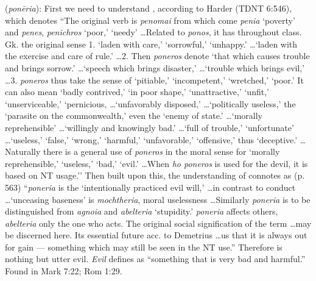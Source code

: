 \item[Evil,]

(\textit{ponēria}):
First we need to understand , according to Harder (TDNT 6:546), which denotes ``The original verb is \emph{penomai} from which come \emph{penia} `poverty' and \emph{penes}, \emph{penichros} `poor,' `needy' \ldots Related to \emph{ponos}, it has throughout class. Gk. the original sense 1. `laden with care,' `sorrowful,' `unhappy.' \ldots `laden with the exercise and care of rule.' \ldots 2. Then \emph{poneros} denote `that which causes trouble and brings sorrow.' \ldots  `speech which brings disaster,' \ldots  `trouble which brings evil,' \ldots 3. \emph{poneros} thus take the sense of `pitiable,' `incompetent,' `wretched,' `poor.' It can also mean `badly contrived,' `in poor shape,' `unattractive,' `unfit,' `unserviceable,' `pernicious, \ldots `unfavorably disposed,' \ldots `politically useless,' the `parasite on the commonwealth,' even the `enemy of state.' \ldots `morally reprehensible' \ldots `willingly and knowingly bad.' \ldots `full of trouble,' `unfortunate' \ldots `useless,' `false,' `wrong,' `harmful,' `unfavorable,' `offensive,' thus `deceptive.' \ldots Naturally there is a general use of \emph{poneros} in the moral sense for `morally reprehensible,' `useless,' `bad,' `evil.' \ldots When \emph{ho poneros} is used for the devil, it is based on NT usage.'' Then built upon this, the understanding of  connotes as (p. 563) ``\emph{poneria} is the `intentionally practiced evil will,' \ldots in contrast to conduct \ldots `unceasing baseness' is \emph{mochtheria}, moral uselessness \ldots Similarly \emph{poneria} is to be distinguished from \emph{agnoia} and \emph{abelteria} `stupidity.' \emph{poneria} affects others, \emph{abelteria} only the one who acts. The original social signification of the term \ldots may be discerned here. Its essential future acc. to Demetrius \ldots us that it is always out for gain --- something which may still be seen in the NT use.'' Therefore  is nothing but utter evil. \emph{Evil} defines as ``something that is very bad and harmful.''
Found in Mark 7:22; Rom 1:29.
